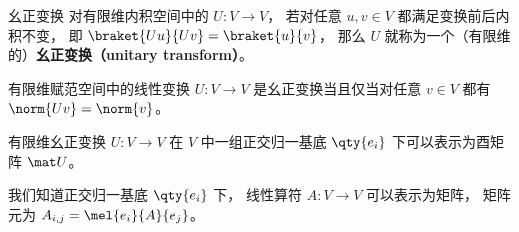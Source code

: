 
\begin{issues}
\issueDraft
\end{issues}


\begin{definition}{幺正变换}
对有限维内积空间中的 $U: V\to V$， 若对任意 $u, v \in V$ 都满足变换前后内积不变， 即 $\braket{Uu}{Uv} = \braket{u}{v}$， 那么 $U$ 就称为一个（有限维的）\textbf{幺正变换（unitary transform）}。
\end{definition}

\begin{theorem}{}
有限维赋范空间中的线性变换 $U: V\to V$ 是幺正变换当且仅当对任意 $v\in V$ 都有 $\norm{Uv} = \norm{v}$。
\end{theorem}

\begin{theorem}{}
有限维幺正变换 $U: V\to V$ 在 $V$ 中一组正交归一基底 $\qty{e_i}$ 下可以表示为酉矩阵 $\mat U$。
\end{theorem}
我们知道正交归一基底 $\qty{e_i}$ 下， 线性算符 $A:V\to V$ 可以表示为矩阵， 矩阵元为%
$A_{i,j} = \mel{e_i}{A}{e_j}$。
